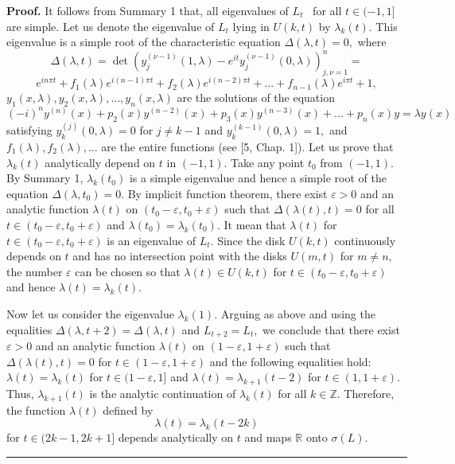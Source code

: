 \documentclass{article}%
\newenvironment{proof}[1][Proof]{\textbf{#1.} }{\ \rule{0.5em}{0.5em}}
\begin{document}
\begin{proof}
It follows from Summary 1 that, all eigenvalues of $L_{t}$ \ for all
$t\in(-1,1]$ are simple. Let us denote the eigenvalue of $L_{t}$ lying in
$U(k,t)$ by $\lambda_{k}(t).$ This eigenvalue is a simple root of the
characteristic equation $\Delta(\lambda,t)=0,$ where
\[
\Delta(\lambda,t)=\det(y_{j}^{(\nu-1)}(1,\lambda)-e^{it}y_{j}^{(\nu
-1)}(0,\lambda))_{j,\nu=1}^{n}=
\]%
\[
e^{in\pi t}+f_{1}(\lambda)e^{i(n-1)\pi t}+f_{2}(\lambda)e^{i(n-2)\pi
t}+...+f_{n-1}(\lambda)e^{i\pi t}+1,
\]
$y_{1}(x,\lambda),y_{2}(x,\lambda),\ldots,y_{n}(x,\lambda)$ are the solutions
of the equation
\[
(-i)^{n}y^{(n)}(x)+p_{2}\left(  x\right)  y^{(n-2)}(x)+p_{3}\left(  x\right)
y^{(n-3)}(x)+...+p_{n}(x)y=\lambda y(x)
\]
satisfying $y_{k}^{(j)}(0,\lambda)=0$ for $j\neq k-1$ and $y_{k}%
^{(k-1)}(0,\lambda)=1,$ and $f_{1}(\lambda),f_{2}(\lambda),...$ are the entire
functions (see [5, Chap. 1]). Let us prove that $\lambda_{k}(t)$ analytically
depend on $t$ in $(-1,1).$ Take any point $t_{0}$ from $(-1,1).$ By Summary 1,
$\lambda_{k}(t_{0})$ is a simple eigenvalue and hence a simple root of the
equation $\Delta(\lambda,t_{0})=0.$ By implicit function theorem, there exist
$\varepsilon>0$ and an analytic function $\lambda(t)$ on $(t_{0}%
-\varepsilon,t_{0}+\varepsilon)$ such that $\Delta(\lambda(t),t)=0$ for all
$t\in(t_{0}-\varepsilon,t_{0}+\varepsilon)$ and $\lambda(t_{0})=\lambda
_{k}(t_{0}).$ It mean that $\lambda(t)$ for $t\in(t_{0}-\varepsilon
,t_{0}+\varepsilon)$ is an eigenvalue of $L_{t}.$ Since the disk $U(k,t)$
continuously depends on $t$ and has no intersection point with the disks
$U(m,t)$ for $m\neq n,$ the number $\varepsilon$ can be chosen so that
$\lambda(t)\in U(k,t)$ for $t\in(t_{0}-\varepsilon,t_{0}+\varepsilon)$ and
hence $\lambda(t)=\lambda_{k}(t).$

Now let us consider the eigenvalue $\lambda_{k}(1).$ Arguing as above and
using the equalities $\Delta(\lambda,t+2)=\Delta(\lambda,t)$ and
$L_{t+2}=L_{t},$ we conclude that there exist $\varepsilon>0$ and an analytic
function $\lambda(t)$ on $(1-\varepsilon,1+\varepsilon)$ such that
$\Delta(\lambda(t),t)=0$ for $t\in(1-\varepsilon,1+\varepsilon)$ and the
following equalities hold: $\lambda(t)=\lambda_{k}(t)$ for $t\in
(1-\varepsilon,1]$ and $\lambda(t)=\lambda_{k+1}(t-2)$ for $t\in
(1,1+\varepsilon).$ Thus, $\lambda_{k+1}(t)$ is the analytic continuation of
$\lambda_{k}(t)$ for all $k\in\mathbb{Z}.$ Therefore, the function
$\lambda(t)$ defined by
\begin{equation}
\lambda(t)=\lambda_{k}(t-2k) \tag{8}%
\end{equation}
for $t\in(2k-1,2k+1]$ depends analytically on $t$ and maps $\mathbb{R}$ onto
$\sigma(L).$
\end{proof}
\end{document}
